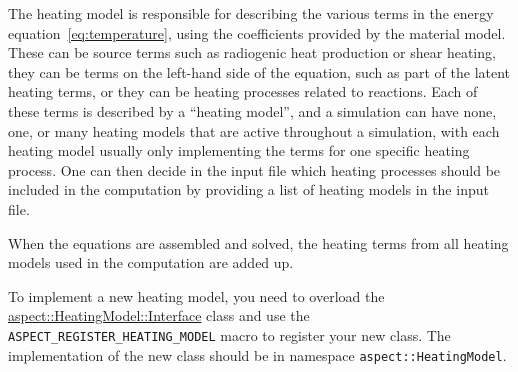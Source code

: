 \documentclass{article}
\begin{document}
  The heating model is responsible for describing the various
terms in the energy equation~\eqref{eq:temperature}, using the
coefficients provided by the material model.  These can be source
terms such as radiogenic heat production or shear heating, they can be
terms on the left-hand side of the equation, such as part of the
latent heating terms, or they can be heating processes related to
reactions. Each of these terms is described by a ``heating model'',
and a simulation can have none, one, or many heating models that are
active throughout a simulation, with each heating model usually only
implementing the terms for one specific heating process. One can then
decide in the input file which heating processes should be included in
the computation by providing a list of heating models in the input
file.

When the equations are assembled and solved, the heating terms from all heating models 
used in the computation are added up.

To implement a new heating model, you need to overload the
\href{doc/doxygen/classaspect_1_1HeatingModel_1_1Interface.html}{aspect::HeatingModel::Interface}
class and use
the \texttt{ASPECT\_REGISTER\_HEATING\_MODEL} macro to register your new
class. The implementation of the new class should be in namespace
\texttt{aspect::HeatingModel}.
\end{document}
